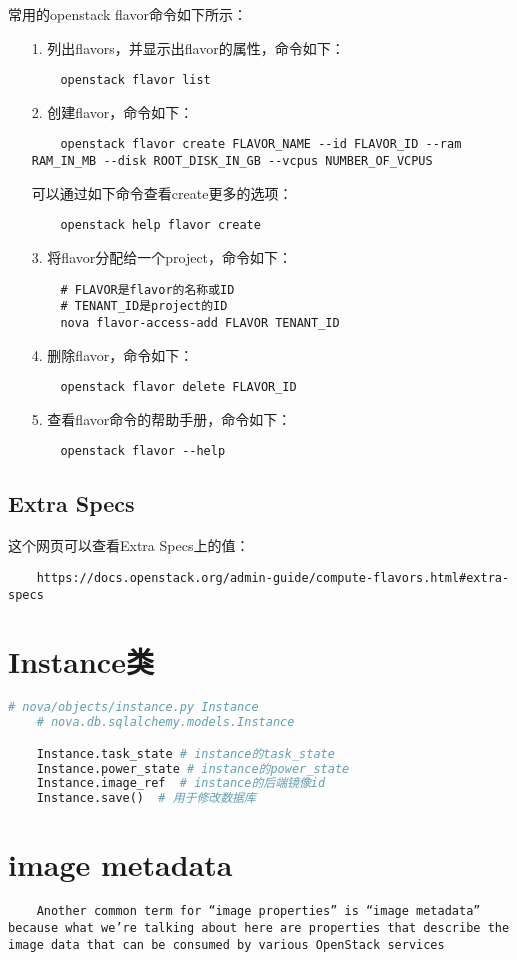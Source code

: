 \documentclass[a4paper,left=1.5cm,right=1.5cm,11pt]{article}
\begin{document}
    常用的openstack flavor命令如下所示：
    \begin{itemize}
        \item[1.] 列出flavors，并显示出flavor的属性，命令如下：
        \begin{lstlisting}
    openstack flavor list
        \end{lstlisting}

        \item[2.] 创建flavor，命令如下：
        \begin{lstlisting}
    openstack flavor create FLAVOR_NAME --id FLAVOR_ID --ram RAM_IN_MB --disk ROOT_DISK_IN_GB --vcpus NUMBER_OF_VCPUS
        \end{lstlisting}

        可以通过如下命令查看create更多的选项：
        \begin{lstlisting}
    openstack help flavor create
        \end{lstlisting}

        \item[3.] 将flavor分配给一个project，命令如下：
        \begin{lstlisting}
    # FLAVOR是flavor的名称或ID
    # TENANT_ID是project的ID
    nova flavor-access-add FLAVOR TENANT_ID
        \end{lstlisting}

        \item[4.] 删除flavor，命令如下：
        \begin{lstlisting}
    openstack flavor delete FLAVOR_ID
        \end{lstlisting}

        \item[5.] 查看flavor命令的帮助手册，命令如下：
        \begin{lstlisting}
    openstack flavor --help
        \end{lstlisting}
    \end{itemize}

\subsection{Extra Specs}
    这个网页可以查看Extra Specs上的值：
    \begin{lstlisting}
    https://docs.openstack.org/admin-guide/compute-flavors.html#extra-specs
    \end{lstlisting}

\section{Instance类}
    \begin{lstlisting}[language = python]
    # nova/objects/instance.py Instance
    # nova.db.sqlalchemy.models.Instance

    Instance.task_state # instance的task_state
    Instance.power_state # instance的power_state
    Instance.image_ref  # instance的后端镜像id
    Instance.save()  # 用于修改数据库
    \end{lstlisting}

\section{image metadata}
    \begin{lstlisting}
    Another common term for “image properties” is “image metadata” because what we’re talking about here are properties that describe the image data that can be consumed by various OpenStack services 
    \end{lstlisting}
\end{document}
